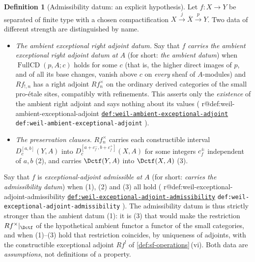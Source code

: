 \documentclass[11pt]{article}
\makeatletter
\theoremstyle{plain}
\theoremstyle{definition}
\newtheorem{definition}[theorem]{Definition}
\newcommand{\up}[1]{%
  \ifcsname r@#1\endcsname
    \hyperref[#1]{\texttt{\scriptsize #1}}%
  \else
    \texttt{\scriptsize #1}%
  \fi}
\newcommand{\Cref}[1]{\hyperref[#1]{\ref{#1}}\,\hyperref[#1]{\nameref*{#1}}}
\makeatother
\begin{document}
\begin{definition}[Admissibility datum: an explicit hypothesis]
\label{def:sf-admissible}
Let $f:X\to Y$ be separated of finite type with a chosen compactification
$X\xrightarrow{j}\overline X\xrightarrow{p}Y$.  Two data of different
strength are distinguished by name.
\begin{itemize}
\item[(1)] \emph{The ambient exceptional right adjoint datum.}  Say that $f$
\emph{carries the ambient exceptional right adjoint datum at $A$} (for short:
\emph{the ambient datum}) when $\operatorname{FullCD}(p,A;c)$ holds for some
$c$ (that is, the higher direct images of $p$, and of all its base changes,
vanish above $c$ on \emph{every} sheaf of $A$-modules) and $Rf_{!,n}$ has a
right adjoint $Rf_n^{\times}$ on the ordinary derived categories of the small
pro-\'etale sites, compatibly with refinements.  This asserts only the
\emph{existence} of the ambient right adjoint and says nothing about its
values (\up{def:weil-ambient-exceptional-adjoint}).
\item[(2)--(3)] \emph{The preservation clauses.}  $Rf_n^{\times}$ carries
each constructible interval $D_c^{[a,b]}(Y,A)$ into
$D_c^{[a+c_f^-,b+c_f^+]}(X,A)$ for some integers $c_f^\pm$ independent of
$a,b$ (2), and carries $\Dctf(Y,A)$ into $\Dctf(X,A)$ (3).
\end{itemize}
Say that $f$ is \emph{exceptional-adjoint admissible at $A$} (for short:
\emph{carries the admissibility datum}) when (1), (2) and (3) all hold
(\up{def:weil-exceptional-adjoint-admissibility}).  The admissibility datum is
thus strictly stronger than the ambient datum (1): it is (3) that would make
the restriction $Rf^{\times}|_{\Dctf}$ of the hypothetical ambient functor a
functor of the small categories, and when (1)--(3) hold that restriction
coincides, by uniqueness of adjoints, with the constructible exceptional
adjoint $Rf^!$ of \Cref{def:sf-operations}(vi).  Both data are
\emph{assumptions}, not definitions of a property.


\end{definition}
\end{document}
